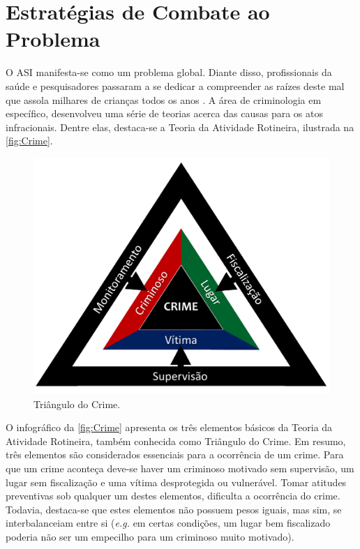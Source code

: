 \chapter{Estratégias de Combate ao Problema}\label{ch:Relacionados}

O \acf{ASI} manifesta-se como um problema global. Diante disso, profissionais da saúde e pesquisadores passaram a se dedicar a compreender as raízes  deste mal que assola milhares de crianças todos os anos \cite{deslandes1994atenccao, dahlberg2006violencia, hora2017violencia}. A área de criminologia em específico, desenvolveu uma série de teorias acerca das causas para os atos infracionais. Dentre elas, destaca-se a Teoria da Atividade Rotineira, ilustrada na \autoref{fig:Crime}.

\begin{figure}
  \vspace{-0.6cm}\caption{\label{fig:Crime}Triângulo do Crime.}
        \begin{center}
          \includegraphics[width=\linewidth]{./Visuais/TrianguloCrime.pdf}
        \end{center}
\end{figure}

O infográfico da \autoref{fig:Crime} apresenta os três elementos básicos da Teoria da Atividade Rotineira, também conhecida como Triângulo do Crime. Em resumo, três elementos são considerados essenciais para a ocorrência de um crime. Para que um crime aconteça deve-se haver um criminoso motivado sem supervisão, um lugar sem fiscalização e uma vítima desprotegida ou vulnerável. Tomar atitudes preventivas sob qualquer um destes elementos, dificulta a ocorrência do crime. Todavia, destaca-se que estes elementos não possuem pesos iguais, mas sim, se interbalanceiam entre si (\textit{e.g.} em certas condições, um lugar bem fiscalizado poderia não ser um empecilho para um criminoso muito motivado).

